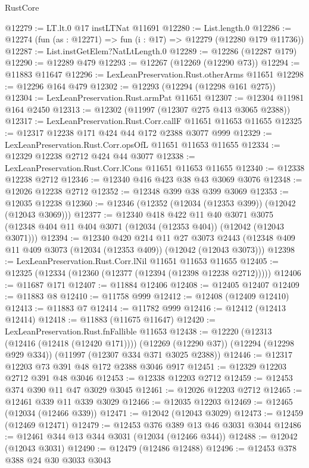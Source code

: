 \begin{lexlean}{RustCore}
\begin{coremodule}
@12279 := LT.lt.{0} @17 instLTNat @11691
@12280 := List.length.{0}
@12286 := @12274 (fun (as : @12271) => fun (i : @17) => @12279 (@12280 @179 @11736))
@12287 := List.instGetElem?NatLtLength.{0}
@12289 := @12286 (@12287 @179)
@12290 := @12289 @479
@12293 := @12267 (@12269 (@12290 @73))
@12294 := @11883 @11647
@12296 := LexLeanPreservation.Rust.otherArms @11651
@12298 := @12296 @164 @479
@12302 := @12293 (@12294 (@12298 @161 @275))
@12304 := LexLeanPreservation.Rust.armPat @11651
@12307 := @12304 @11981 @164 @2450
@12313 := @12302 (@11997 (@12307 @275 @413 @3065 @2388))
@12317 := LexLeanPreservation.Rust.Corr.callF @11651 @11653 @11655
@12325 := @12317 @12238 @171 @424 @44 @172 @2388 @3077 @999
@12329 := LexLeanPreservation.Rust.Corr.opsOfL @11651 @11653 @11655
@12334 := @12329 @12238 @2712 @424 @44 @3077
@12338 := LexLeanPreservation.Rust.Corr.lCons @11651 @11653 @11655
@12340 := @12338 @12238 @2712
@12346 := @12340 @416 @423 @38 @43 @3069 @3076
@12348 := @12026 @12238 @2712
@12352 := @12348 @399 @38 @399 @3069
@12353 := @12035 @12238
@12360 := @12346 (@12352 (@12034 (@12353 @399)) (@12042 (@12043 @3069)))
@12377 := @12340
    @418
    @422
    @11
    @40
    @3071
    @3075
    (@12348 @404 @11 @404 @3071 (@12034 (@12353 @404)) (@12042 (@12043 @3071)))
@12394 := @12340
    @420
    @214
    @11
    @27
    @3073
    @2443
    (@12348 @409 @11 @409 @3073 (@12034 (@12353 @409)) (@12042 (@12043 @3073)))
@12398 := LexLeanPreservation.Rust.Corr.lNil @11651 @11653 @11655
@12405 := @12325 (@12334 (@12360 (@12377 (@12394 (@12398 @12238 @2712)))))
@12406 := @11687 @171
@12407 := @11884 @12406
@12408 := @12405 @12407
@12409 := @11883 @8
@12410 := @11758 @999
@12412 := @12408 (@12409 @12410)
@12413 := @11883 @7
@12414 := @11782 @999
@12416 := @12412 (@12413 @12414)
@12418 := @11883 (@11675 @11647)
@12420 := LexLeanPreservation.Rust.fnFallible @11653
@12438 := @12220
    (@12313 (@12416 (@12418 (@12420 @171))))
    (@12269 (@12290 @37))
    (@12294 (@12298 @929 @334))
    (@11997 (@12307 @334 @371 @3025 @2388))
@12446 := @12317 @12203 @73 @391 @48 @172 @2388 @3046 @917
@12451 := @12329 @12203 @2712 @391 @48 @3046
@12453 := @12338 @12203 @2712
@12459 := @12453 @374 @390 @11 @47 @3029 @3045
@12461 := @12026 @12203 @2712
@12465 := @12461 @339 @11 @339 @3029
@12466 := @12035 @12203
@12469 := @12465 (@12034 (@12466 @339))
@12471 := @12042 (@12043 @3029)
@12473 := @12459 (@12469 @12471)
@12479 := @12453 @376 @389 @13 @46 @3031 @3044
@12486 := @12461 @344 @13 @344 @3031 (@12034 (@12466 @344))
@12488 := @12042 (@12043 @3031)
@12490 := @12479 (@12486 @12488)
@12496 := @12453 @378 @388 @24 @30 @3033 @3043

\end{coremodule}
\end{lexlean}
